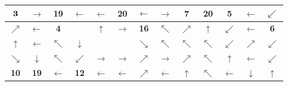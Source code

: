 \begin{center}
\begin{minipage}{\textwidth}
\renewcommand{\arraystretch}{1.3}
\begin{table}[H]
\centering 
\begin{scriptsize}
\begin{tabular}{|>{}c|>{}c|>{}c|>{}c|>{}c|>{}c|>{}c|>{}c|>{}c|>{}c|>{}c|>{}c|>{}c|}
\hline
$\bf{3}$&\cellcolor{red!15!white}$\rightarrow$&\cellcolor{red!15!white}\bf{19}&\cellcolor{red!15!white}$\leftarrow$&\cellcolor{red!15!white}$\leftarrow$&\cellcolor{blue!15!white}\bf{20}&\cellcolor{blue!15!white}$\cellcolor{blue!15!white}\leftarrow$&$\rightarrow$&\bf{7}&\cellcolor{red!15!white}\bf{20}&
\cellcolor{yellow!15!white}\bf{5}&\cellcolor{yellow!15!white}$\leftarrow$&$\cellcolor{red!15!white}\swarrow$\\
\hline
\cellcolor{red!15!white}$\nearrow$&$\cellcolor{red!15!white}\leftarrow$&\bf{4}&\cellcolor{gray!50!white} &
\cellcolor{red!15!white}$\uparrow$&\cellcolor{green!15!white}$\rightarrow$&\cellcolor{green!15!white}\bf{16}&\cellcolor{blue!15!white}$\nwarrow$&
\cellcolor{red!15!white}$\nearrow$&\cellcolor{red!15!white}$\uparrow$&\cellcolor{red!15!white}$\swarrow$&\cellcolor{red!15!white}$\leftarrow$&\bf{6} \\
\hline
\cellcolor{red!15!white}$\uparrow$&\cellcolor{red!15!white}$\leftarrow$&\cellcolor{red!15!white}$\nwarrow$&\cellcolor{blue!15!white}$\downarrow$&
\cellcolor{gray!50!white}&\cellcolor{gray!50!white}&\cellcolor{red!15!white}$\searrow$ &\cellcolor{green!15!white}$\nwarrow$ &\cellcolor{blue!15!white}$\nwarrow$ &\cellcolor{red!15!white}$\nwarrow$&\cellcolor{blue!15!white}$\swarrow$ &$\nearrow$ &\cellcolor{blue!15!white}$\swarrow$ \\
\hline
\cellcolor{blue!15!white}$\searrow$&\cellcolor{blue!15!white}$\downarrow$&\cellcolor{red!15!white}$\nwarrow$&\cellcolor{blue!15!white}$\swarrow$&\cellcolor{green!15!white}
$\rightarrow$&\cellcolor{green!15!white}$\rightarrow$&\cellcolor{green!15!white}$\nearrow$&\cellcolor{red!15!white}$\rightarrow$&\cellcolor{red!15!white}$\nearrow$ 
&\cellcolor{blue!15!white}$\nwarrow$ &\cellcolor{blue!15!white}$\uparrow$&\cellcolor{blue!15!white}$\leftarrow$ &\cellcolor{green!15!white}$\swarrow$ \\
\hline
\bf{10}&\cellcolor{blue!15!white}\bf{19}&\cellcolor{blue!15!white}$\leftarrow$&\cellcolor{yellow!15!white}\bf{12}&\cellcolor{yellow!15!white}
$\leftarrow$&\cellcolor{yellow!15!white}$\leftarrow$&\cellcolor{red!15!white}$\nearrow$&\cellcolor{red!15!white}$\leftarrow$&\cellcolor{red!15!white}$\uparrow$ &\cellcolor{red!15!white}$\nwarrow$&\cellcolor{red!15!white}$\leftarrow$&\cellcolor{green!15!white}$\downarrow$&\cellcolor{green!15!white}$\uparrow$\\

\end{tabular}
\end{scriptsize}
\end{table}
\end{minipage}
\end{center}
